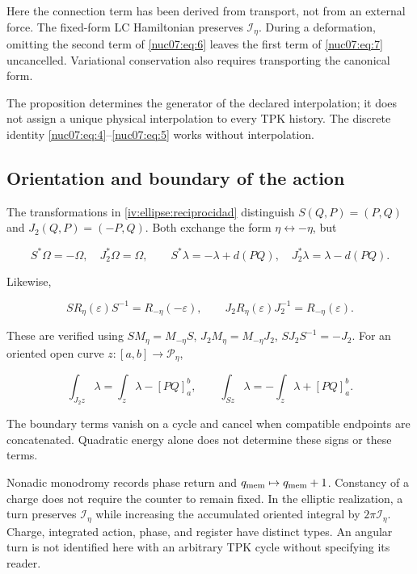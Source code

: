 Here the connection term has been derived from transport, not from an external force. The fixed-form LC Hamiltonian preserves \(\mathcal I_\eta\). During a deformation, omitting the second term of \eqref{nuc07:eq:6} leaves the first term of \eqref{nuc07:eq:7} uncancelled. Variational conservation also requires transporting the canonical form.

The proposition determines the generator of the declared interpolation; it does not assign a unique physical interpolation to every TPK history. The discrete identity \eqref{nuc07:eq:4}–\eqref{nuc07:eq:5} works without interpolation.

\subsection{Orientation and boundary of the action}

The transformations in \cref{iv:ellipse:reciprocidad} distinguish \(S(Q,P)=(P,Q)\) and \(J_2(Q,P)=(-P,Q)\). Both exchange the form \(\eta\leftrightarrow-\eta\), but

\begin{equation}
S^*\Omega=-\Omega,\quad J_2^*\Omega=\Omega,\qquad
S^*\lambda=-\lambda+d(PQ),\quad
J_2^*\lambda=\lambda-d(PQ).
\label{nuc07:eq:9}
\end{equation}

Likewise,

\begin{equation}
S R_\eta(\varepsilon)S^{-1}=R_{-\eta}(-\varepsilon),\qquad
J_2R_\eta(\varepsilon)J_2^{-1}=R_{-\eta}(\varepsilon).
\label{nuc07:eq:10}
\end{equation}

These are verified using \(SM_\eta=M_{-\eta}S\), \(J_2M_\eta=M_{-\eta}J_2\), \(SJ_2S^{-1}=-J_2\). For an oriented open curve \(z:[a,b]\to\mathcal P_\eta\),

\begin{equation}
\int_{J_2z}\lambda=\int_z\lambda-[PQ]_a^b,\qquad
\int_{Sz}\lambda=-\int_z\lambda+[PQ]_a^b.
\label{nuc07:eq:11}
\end{equation}

The boundary terms vanish on a cycle and cancel when compatible endpoints are concatenated. Quadratic energy alone does not determine these signs or these terms.

Nonadic monodromy records phase return and \(q_{\rm mem}\mapsto q_{\rm mem}+1\). Constancy of a charge does not require the counter to remain fixed. In the elliptic realization, a turn preserves \(\mathcal I_\eta\) while increasing the accumulated oriented integral by \(2\pi\mathcal I_\eta\). Charge, integrated action, phase, and register have distinct types. An angular turn is not identified here with an arbitrary TPK cycle without specifying its reader.

